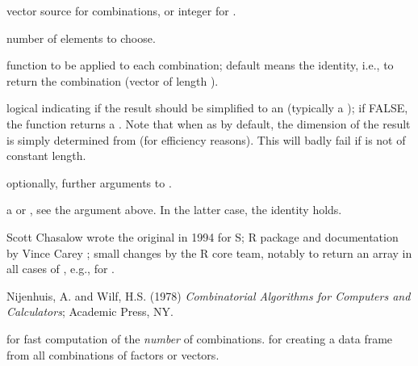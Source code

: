 %
\begin{Arguments}
\begin{ldescription}
\item[\code{x}] vector source for combinations, or integer  for
.
\item[\code{m}] number of elements to choose.
\item[\code{FUN}] function to be applied to each combination; default
 means the identity, i.e., to return the combination
(vector of length ).
\item[\code{simplify}] logical indicating if the result should be simplified
to an  (typically a ); if
FALSE, the function returns a .  Note that when
 as by default, the dimension of the result is
simply determined from  (for
efficiency reasons).  This will badly fail if  is not of
constant length.
\item[\code{...}] optionally, further arguments to .
\end{ldescription}
\end{Arguments}
%
\begin{Value}
a  or , see the 
argument above.  In the latter case, the identity
 holds.
\end{Value}
%
\begin{Author}\relax
Scott Chasalow wrote the original in 1994 for S;
R package  and documentation by Vince Carey
;
small changes by the R core team, notably to return an array in all
cases of , e.g., for .
\end{Author}
%
\begin{References}\relax
Nijenhuis, A. and Wilf, H.S. (1978)
\emph{Combinatorial Algorithms for Computers and Calculators};
Academic Press, NY.
\end{References}
%
\begin{SeeAlso}\relax
{} for fast computation of the \emph{number} of
combinations.  for creating a data frame from
all combinations of factors or vectors.
\end{SeeAlso}
%
